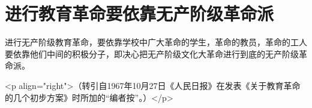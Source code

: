 \section[进行教育革命要依靠无产阶级革命派（一九六七年十月二十五日）]{进行教育革命要依靠无产阶级革命派}


进行无产阶级教育革命，要依靠学校中广大革命的学生，革命的教员，革命的工人要依靠他们中间的积极分子，即决心把无产阶级文化大革命进行到底的无产阶级革命派。

<p align="right">（转引自1967年10月27日《人民日报》在发表《关于教育革命的几个初步方案》时所加的“编者按”。）</p>


